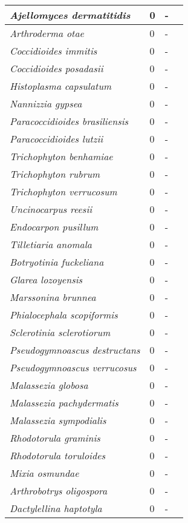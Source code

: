 {\begin{longtable}{| L{4cm} | L{2cm}  | L{5cm} | L{4cm} |}
\textit{Ajellomyces dermatitidis} & 0 & - & \\ \hline
\textit{Arthroderma otae} & 0 & - & \\ \hline
\textit{Coccidioides immitis} & 0 & - & \\ \hline
\textit{Coccidioides posadasii} & 0 & - & \\ \hline
\textit{Histoplasma capsulatum} & 0 & - & \\ \hline
\textit{Nannizzia gypsea} & 0 & - & \\ \hline
\textit{Paracoccidioides brasiliensis} & 0 & - & \\ \hline
\textit{Paracoccidioides lutzii} & 0 & - & \\ \hline
\textit{Trichophyton benhamiae} & 0 & - & \\ \hline
\textit{Trichophyton rubrum} & 0 & - & \\ \hline
\textit{Trichophyton verrucosum} & 0 & - & \\ \hline
\textit{Uncinocarpus reesii} & 0 & - & \\ \hline
\textit{Endocarpon pusillum} & 0 & - & \\ \hline
\textit{Tilletiaria anomala} & 0 & - & \\ \hline
\textit{Botryotinia fuckeliana} & 0 & - & \\ \hline
\textit{Glarea lozoyensis} & 0 & - & \\ \hline
\textit{Marssonina brunnea} & 0 & - & \\ \hline
\textit{Phialocephala scopiformis} & 0 & - & \\ \hline
\textit{Sclerotinia sclerotiorum} & 0 & - & \\ \hline
\textit{Pseudogymnoascus destructans} & 0 & - & \\ \hline
\textit{Pseudogymnoascus verrucosus} & 0 & - & \\ \hline
\textit{Malassezia globosa} & 0 & - & \\ \hline
\textit{Malassezia pachydermatis} & 0 & - & \\ \hline
\textit{Malassezia sympodialis} & 0 & - & \\ \hline
\textit{Rhodotorula graminis} & 0 & - & \\ \hline
\textit{Rhodotorula toruloides} & 0 & - & \\ \hline
\textit{Mixia osmundae} & 0 & - & \\ \hline
\textit{Arthrobotrys oligospora} & 0 & - & \\ \hline
\textit{Dactylellina haptotyla} & 0 & - & \\ \hline

\end{longtable}}
